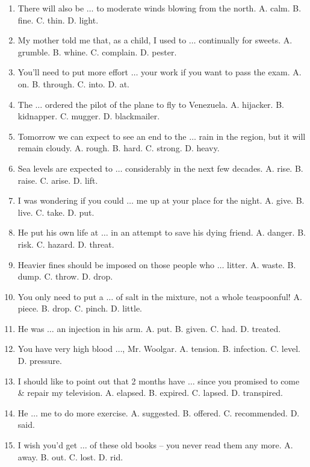 \documentclass{article}
\numberwithin{equation}{section}
\begin{document}
\begin{enumerate}[leftmargin=8mm]
	\item There will also be $\ldots$ to moderate winds blowing from the north. {\sf A.} calm. {\sf B.} fine. {\sf C.} thin. {\sf D.} light.
	\item My mother told me that, as a child, I used to $\ldots$ continually for sweets. {\sf A.} grumble. {\sf B.} whine. {\sf C.} complain. {\sf D.} pester.
	\item You'll need to put more effort $\ldots$ your work if you want to pass the exam. {\sf A.} on. {\sf B.} through. {\sf C.} into. {\sf D.} at.
	\item The $\ldots$ ordered the pilot of the plane to fly to Venezuela. {\sf A.} hijacker. {\sf B.} kidnapper. {\sf C.} mugger. {\sf D.} blackmailer.
	\item Tomorrow we can expect to see an end to the $\ldots$ rain in the region, but it will remain cloudy. {\sf A.} rough. {\sf B.} hard. {\sf C.} strong. {\sf D.} heavy.
	\item Sea levels are expected to $\ldots$ considerably in the next few decades. {\sf A.} rise. {\sf B.} raise. {\sf C.} arise. {\sf D.} lift.
	\item I was wondering if you could $\ldots$ me up at your place for the night. {\sf A.} give. {\sf B.} live. {\sf C.} take. {\sf D.} put.
	\item He put his own life at $\ldots$ in an attempt to save his dying friend. {\sf A.} danger. {\sf B.} risk. {\sf C.} hazard. {\sf D.} threat.
	\item Heavier fines should be imposed on those people who $\ldots$ litter. {\sf A.} waste. {\sf B.} dump. {\sf C.} throw. {\sf D.} drop.
	\item You only need to put a $\ldots$ of salt in the mixture, not a whole teaspoonful! {\sf A.} piece. {\sf B.} drop. {\sf C.} pinch. {\sf D.} little.
	\item He was $\ldots$ an injection in his arm. {\sf A.} put. {\sf B.} given. {\sf C.} had. {\sf D.} treated.
	\item You have very high blood $\ldots$, Mr. Woolgar. {\sf A.} tension. {\sf B.} infection. {\sf C.} level. {\sf D.} pressure.
	\item I should like to point out that 2 months have $\ldots$ since you promised to come \& repair my television. {\sf A.} elapsed. {\sf B.} expired. {\sf C.} lapsed. {\sf D.} transpired.
	\item He $\ldots$ me to do more exercise. {\sf A.} suggested. {\sf B.} offered. {\sf C.} recommended. {\sf D.} said.
	\item I wish you'd get $\ldots$ of these old books -- you never read them any more. {\sf A.} away. {\sf B.} out. {\sf C.} lost. {\sf D.} rid.

\end{enumerate}
\end{document}
